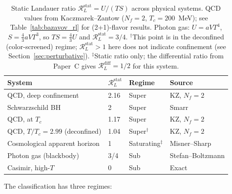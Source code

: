 \documentclass[%
 aip,
 amsmath,amssymb,
 reprint,%
]{revtex4-2}
\newcommand{\RLs}{\mathcal{R}_L^{\mathrm{stat}}}
\newcommand{\RLd}{\mathcal{R}_L^{\mathrm{diff}}}
\begin{document}
\begin{table}[t]
\centering
\caption{Static Landauer ratio $\RLs = U/(TS)$ across
physical systems.  QCD values from Kaczmarek--Zantow
($N_f = 2$, $T_c = 200$~MeV); see Table~\ref{tab:bazavov_rl}
for (2+1)-flavor results.  Photon gas: $U = aVT^4$,
$S = \tfrac{4}{3}aVT^3$, so $TS = \tfrac{4}{3}U$ and
$\RLs = 3/4$.
$^{\dagger}$This point is in the deconfined (color-screened)
regime; $\RLs > 1$ here does not indicate confinement
(see Section~\ref{sec:perturbative}).
$^{\ddagger}$Static ratio only; the differential ratio from
Paper~C gives $\RLd = 1/2$ for this system.}
\label{tab:classification}
\begin{tabular}{@{}llll@{}}
\toprule
System & $\RLs$ & Regime & Source \\
\midrule
QCD, deep confinement & 2.16 & Super & KZ, $N_f\!=\!2$ \\
Schwarzschild BH      & 2    & Super & Smarr \\
QCD, at $T_c$         & 1.17 & Super & KZ, $N_f\!=\!2$ \\
QCD, $T/T_c = 2.99$ (deconfined) & 1.04 & Super$^{\dagger}$ & KZ, $N_f\!=\!2$ \\
\midrule
Cosmological apparent horizon & 1 & Saturating$^{\ddagger}$ & Misner--Sharp \\
\midrule
Photon gas (blackbody) & 3/4  & Sub & Stefan--Boltzmann \\
Casimir, high-$T$      & 0    & Sub & Exact \\
\bottomrule
\end{tabular}
\end{table}

The classification has three regimes:
\end{document}
